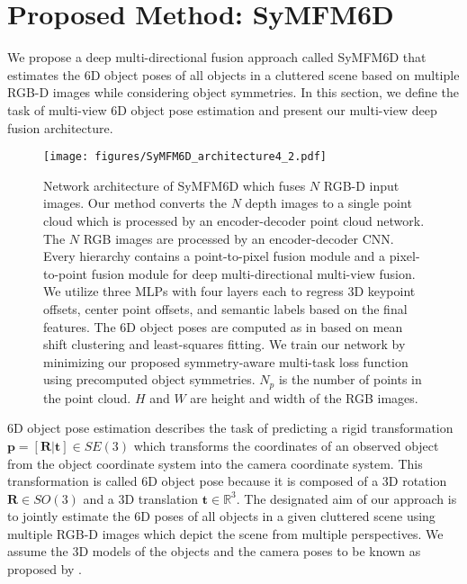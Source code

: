 \section{Proposed Method: SyMFM6D}

We propose a deep multi-directional fusion approach called SyMFM6D that estimates the 6D object poses of all objects in a cluttered scene based on multiple RGB-D images while considering object symmetries. 
In this section, we define the task of multi-view 6D object pose estimation and present our multi-view deep fusion architecture.

\begin{figure*}[tbh]
  \vspace{2mm}
  \centering
  \texttt{[image: figures/SyMFM6D\_architecture4\_2.pdf]}
   \caption{Network architecture of SyMFM6D which fuses $N$ RGB-D input images. Our method converts the $N$ depth images to a single point cloud which is processed by an encoder-decoder point cloud network. The $N$ RGB images are processed by an encoder-decoder CNN. Every hierarchy contains a point-to-pixel fusion module and a pixel-to-point fusion module for deep multi-directional multi-view fusion. We utilize three MLPs with four layers each to regress 3D keypoint offsets, center point offsets, and semantic labels based on the final features. The 6D object poses are computed as in \cite{pvn3d} based on mean shift clustering and least-squares fitting. We train our network by minimizing our proposed symmetry-aware multi-task loss function using precomputed object symmetries. $N_p$ is the number of points in the point cloud. $H$ and $W$ are height and width of the RGB images.}
   \label{fig_architecture}
   \vspace{-2mm}
\end{figure*}


6D object pose estimation describes the task of predicting a rigid transformation $\boldsymbol p = [\boldsymbol R |  \boldsymbol t] \in SE(3)$ which transforms the coordinates of an observed object from the object coordinate system into the camera coordinate system. This transformation is called 6D object pose because it is composed of a 3D rotation $\boldsymbol R \in SO(3)$ and a 3D translation $\boldsymbol t \in \mathbb{R}^3$. 
The designated aim of our approach is to jointly estimate the 6D poses of all objects in a given cluttered scene using multiple RGB-D images which depict the scene from multiple perspectives. We assume the 3D models of the objects and the camera poses to be known as proposed by \cite{mv6d}.



